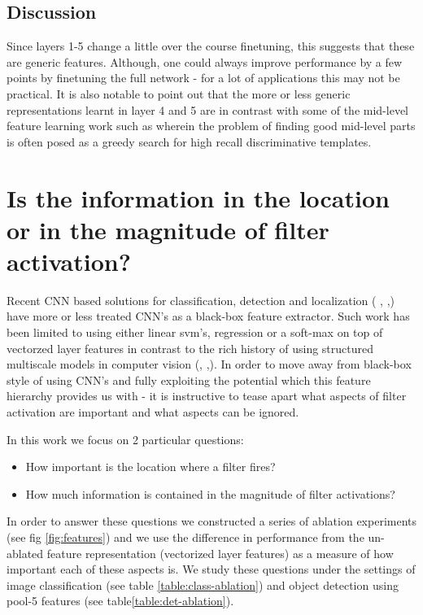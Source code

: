 \documentclass[runningheads]{llncs}
\begin{document}
\subsection{Discussion}
\label{sub:fine-discussion}
Since layers 1-5 change a little over the course finetuning, this suggests that these are generic features. Although, one could always improve performance by a few points by finetuning the full network - for a lot of applications this may not be practical. 
It is also notable to point out that the more or less generic representations learnt in layer 4 and 5 are in contrast with some of the mid-level feature learning work such as wherein the problem of finding good mid-level parts is often posed as a greedy search for high recall discriminative templates.


\section{Is the information in the location or in the magnitude of filter activation?}
\label{sec-where-info}
Recent CNN based solutions for  classification, detection and localization ( \cite{overfeat}, \cite{Decaf},\cite{Rcnn}) have more or less treated CNN's as a black-box feature extractor. Such work has been limited to using either linear svm's, regression or a soft-max on top of vectorzed layer features in contrast to the rich history of using structured multiscale models in computer vision (\cite{DPM}, \cite{YangRamanan},\cite{Poselets}). In order to move away from black-box style of using CNN's and fully exploiting the potential which this feature hierarchy provides us with - it is instructive to tease apart what aspects of filter activation are important and what aspects can be ignored. 

In this work we focus on 2 particular questions:
\begin{itemize}
\item How important is the location where a filter fires?
\item How much information is contained in the magnitude of filter activations?
\end{itemize}

In order to answer these questions we constructed a series of ablation experiments (see fig \ref{fig:features}) and we use the difference in performance from the un-ablated feature representation (vectorized layer features) as a measure of how important each of these aspects is. We study these questions under the  settings of image classification (see table \ref{table:class-ablation}) and object detection using pool-5 features (see table\ref{table:det-ablation}). 
\end{document}
